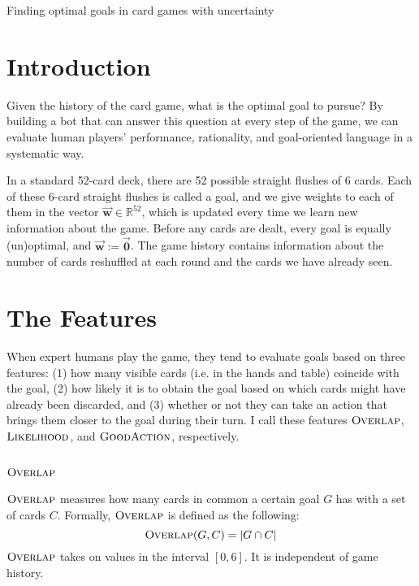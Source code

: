 \documentclass[11pt]{article}
\newcommand{\bvec}[1]{\vec{\mathbf{#1}}}
\newcommand{\R}{\mathbb{R}}
\newcommand{\overlap}{\textsc{Overlap}}
\newcommand{\lkhd}{\textsc{Likelihood}}
\newcommand{\goodaction}{\textsc{GoodAction}}
\begin{document}
\begin{center}
\Large{Finding optimal goals in card games with uncertainty}
\end{center}

\section{Introduction}

Given the history of the card game, what is the optimal goal to pursue? By building a bot that can answer this question at every step of the game, we can evaluate human players' performance, rationality, and goal-oriented language in a systematic way.

In a standard 52-card deck, there are 52 possible straight flushes of 6 cards. Each of these 6-card straight flushes is called a goal, and we give weights to each of them in the vector $\bvec{w} \in \R^{52}$, which is updated every time we learn new information about the game. Before any cards are dealt, every goal is equally (un)optimal, and $\bvec{w} := \bvec{0}$. The game history contains information about the number of cards reshuffled at each round and the cards we have already seen.

\section{The Features}

When expert humans play the game, they tend to evaluate goals based on three features: (1) how many visible cards (i.e. in the hands and table) coincide with the goal, (2) how likely it is to obtain the goal based on which cards might have already been discarded, and (3) whether or not they can take an action that brings them closer to the goal during their turn. I call these features $\overlap$, $\lkhd$, and $\goodaction$, respectively.

\subsection{$\overlap$}

$\overlap$ measures how many cards in common a certain goal $G$ has with a set of cards $C$. Formally, $\overlap$ is defined as the following:
\begin{equation}
\overlap(G,C) = |G \cap C|
\label{eq:overlap} \end{equation}
$\overlap$ takes on values in the interval $[0,6]$. It is independent of game history.
\end{document}
